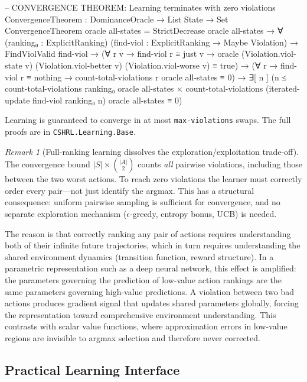 \documentclass[9pt,a4paper]{article}
\newcommand{\fpath}[1]{\nolinkurl{#1}}
\theoremstyle{plain}
\theoremstyle{definition}
\theoremstyle{remark}
\newtheorem{remark}{Remark}
\begin{document}
\begin{code}
  -- CONVERGENCE THEOREM: Learning terminates with zero violations
  ConvergenceTheorem : DominanceOracle → List State → Set
  ConvergenceTheorem oracle all-states = 
    StrictDecrease oracle all-states →
    ∀ (ranking₀ : ExplicitRanking) 
      (find-viol : ExplicitRanking → Maybe Violation) →
    FindViolValid find-viol →
    (∀ r v → find-viol r ≡ just v → 
       oracle (Violation.viol-state v) (Violation.viol-better v) 
              (Violation.viol-worse v) ≡ true) →
    (∀ r → find-viol r ≡ nothing → 
       count-total-violations r oracle all-states ≡ 0) →
    ∃[ n ] (n ≤ count-total-violations ranking₀ oracle all-states × 
            count-total-violations (iterated-update find-viol ranking₀ n) 
              oracle all-states ≡ 0)
\end{code}

Learning is guaranteed to converge in at most \texttt{max-violations} swaps. The full proofs are in \fpath{CSHRL.Learning.Base}.

\begin{remark}[Full-ranking learning dissolves the exploration/exploitation trade-off]\label{rem:exploration}
The convergence bound $|S| \times \binom{|A|}{2}$ counts \emph{all} pairwise violations, including those between the two worst actions.  To reach zero violations the learner must correctly order every pair---not just identify the argmax.  This has a structural consequence: uniform pairwise sampling is sufficient for convergence, and no separate exploration mechanism ($\epsilon$-greedy, entropy bonus, UCB) is needed.

The reason is that correctly ranking any pair of actions requires understanding both of their infinite future trajectories, which in turn requires understanding the shared environment dynamics (transition function, reward structure).  In a parametric representation such as a deep neural network, this effect is amplified: the parameters governing the prediction of low-value action rankings are the same parameters governing high-value predictions.  A violation between two bad actions produces gradient signal that updates shared parameters globally, forcing the representation toward comprehensive environment understanding.  This contrasts with scalar value functions, where approximation errors in low-value regions are invisible to argmax selection and therefore never corrected.
\end{remark}

\subsection{Practical Learning Interface}
\end{document}
